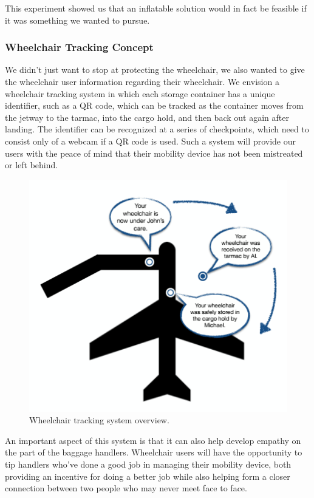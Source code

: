 This experiment showed us that an inflatable solution would in fact be feasible if it was something we wanted to pursue.

\subsubsection{Wheelchair Tracking Concept}

We didn't just want to stop at protecting the wheelchair, we also wanted to give the wheelchair user information regarding their wheelchair. 
We envision a wheelchair tracking system in which each storage container has a unique identifier, such as a QR code, which can be tracked as the container moves from the jetway to the tarmac, into the cargo hold, and then back out again after landing. The identifier can be recognized at a series of checkpoints, which need to consist only of a webcam if a QR code is used. Such a system will provide our users with the peace of mind that their mobility device has not been mistreated or left behind.

\begin{figure}[h!]
  \centering
     \includegraphics[width=12cm]{images/tracking.png}
   \caption{Wheelchair tracking system overview.}
  \label{fig:tracking}
\end{figure}

\newpage

An important aspect of this system is that it can also help develop empathy on the part of the baggage handlers. Wheelchair users will have the opportunity to tip handlers who've done a good job in managing their mobility device, both providing an incentive for doing a better job while also helping form a closer connection between two people who may never meet face to face.

